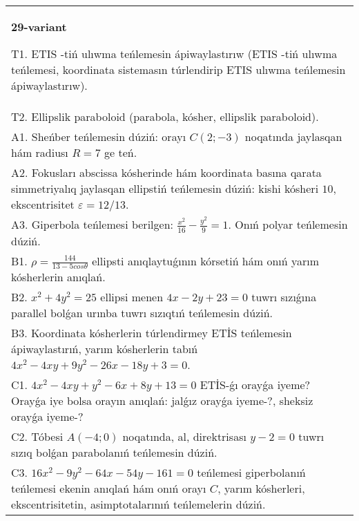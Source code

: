 \documentclass{article}
\begin{document}
\begin{tabular}{m{17cm}}
\textbf{29-variant}
\newline

T1. ETIS -tiń ulıwma teńlemesin ápiwaylastırıw (ETIS -tiń ulıwma teńlemesi, koordinata sistemasın túrlendirip ETIS ulıwma teńlemesin ápiwaylastırıw).\\

T2. Ellipslik paraboloid (parabola, kósher, ellipslik paraboloid).\\

A1. Sheńber teńlemesin dúziń: orayı $C (2;-3) $ noqatında jaylasqan hám radiusı $R=7$ ge teń.\\

A2. Fokusları abscissa kósherinde hám koordinata basına qarata simmetriyalıq jaylasqan ellipstiń teńlemesin dúziń: kishi kósheri $10$, ekscentrisitet $\varepsilon=12/13$.\\

A3. Giperbola teńlemesi berilgen: $\frac{x^{2}}{16}-\frac{y^{2}}{9}=1$. Onıń polyar teńlemesin dúziń.\\

B1. $\rho = \frac{144}{13 - 5cos\theta}$ ellipsti anıqlaytuǵının kórsetiń hám onıń yarım kósherlerin anıqlań.\\

B2. $x^{2} + 4y^{2} = 25$ ellipsi menen $4x - 2y + 23 = 0$ tuwrı sızıǵına parallel bolǵan urınba tuwrı sızıqtıń teńlemesin dúziń.  \\

B3. Koordinata kósherlerin túrlendirmey ETİS teńlemesin ápiwaylastırıń, yarım kósherlerin tabıń $4x^{2} - 4xy + 9y^{2} - 26x - 18y + 3 = 0$.\\

C1. $4x^{2} - 4xy + y^{2} - 6x + 8y + 13 = 0$ ETİS-ǵı orayǵa iyeme? Orayǵa iye bolsa orayın anıqlań: jalǵız orayǵa iyeme-?, sheksiz orayǵa iyeme-?  \\

C2. Tóbesi $A(-4;0)$ noqatında, al, direktrisası $y - 2 = 0$ tuwrı sızıq bolǵan parabolanıń teńlemesin dúziń.\\

C3. $16x^{2} - 9y^{2} - 64x - 54y - 161 = 0$ teńlemesi giperbolanıń teńlemesi ekenin anıqlań hám onıń orayı $C$, yarım kósherleri, ekscentrisitetin, asimptotalarınıń teńlemelerin dúziń.  \\

\end{tabular}
\vspace{1cm}
\end{document}
